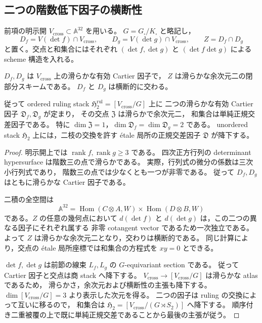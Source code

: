 
\subsection{二つの階数低下因子の横断性}
\label{subsec:qa-square-rank-boundary-geometry}

前項の明示開 $V_{\mathrm{cross}}\subset\mathbb A^{32}$ を用いる。
$G=G_\square/K_\square$ と略記し，
\[
 D_f=V(\det f)\cap V_{\mathrm{cross}},\qquad
 D_g=V(\det g)\cap V_{\mathrm{cross}},\qquad
 Z=D_f\cap D_g
\]
と置く。交点と和集合にはそれぞれ
$(\det f,\det g)$ と $(\det f\det g)$ による scheme 構造を入れる。

\begin{proposition}[全域の横断的階数低下]
\label{prop:qa-square-global-transverse-rank-divisors}
$D_f,D_g$ は $V_{\mathrm{cross}}$ 上の滑らかな有効 Cartier 因子で，
$Z$ は滑らかな余次元二の閉部分スキームである。
$D_f$ と $D_g$ は横断的に交わる。

従って ordered ruling stack
$\mathfrak H_2^{\mathrm{rul}}=[V_{\mathrm{cross}}/G]$ 上に
二つの滑らかな有効 Cartier 因子
$\mathfrak D_f,\mathfrak D_g$ が定まり，
その交点 $\mathfrak Z$ は滑らかで余次元二，
和集合は単純正規交差因子である。
特に $\dim\mathfrak Z=1$，$\dim\mathfrak D_f=\dim\mathfrak D_g=2$ である。
unordered stack $\mathfrak H_2$ 上には，二枝の交換を許す
\'etale 局所の正規交差因子 $\mathfrak D$ が降下する。
\end{proposition}

\begin{proof}
明示開上では $\operatorname{rank}f,\operatorname{rank}g\geq3$ である。
四次正方行列の determinant hypersurface は階数三の点で滑らかである。
実際，行列式の微分の係数は三次小行列式であり，
階数三の点では少なくとも一つが非零である。
従って $D_f,D_g$ はともに滑らかな Cartier 因子である。

二積の全空間は
\[
 \mathbb A^{32}
  =\operatorname{Hom}(C\otimes A,W)
     \times\operatorname{Hom}(D\otimes B,W)
\]
である。$Z$ の任意の幾何点において
$d(\det f)$ と $d(\det g)$ は，この二つの異なる因子にそれぞれ属する
非零 cotangent vector であるため一次独立である。
よって $Z$ は滑らかな余次元二となり，交わりは横断的である。
同じ計算により，交点の \'etale 局所座標では和集合の方程式を $xy=0$ とできる。

$\det f,\det g$ は前節の線束 $L_f,L_g$ の $G$-equivariant section である。
従って Cartier 因子と交点は商 stack へ降下する。
$V_{\mathrm{cross}}\to[V_{\mathrm{cross}}/G]$ は滑らかな atlas であるため，
滑らかさ，余次元および横断性の主張も降下する。
$\dim[V_{\mathrm{cross}}/G]=3$ より表示した次元を得る。
二つの因子は ruling の交換によって互いに移るので，
和集合は $\mathfrak H_2=[V_{\mathrm{cross}}/(G\rtimes S_2)]$ へ降下する。
順序付き二重被覆の上で既に単純正規交差であることから最後の主張が従う。
\end{proof}

